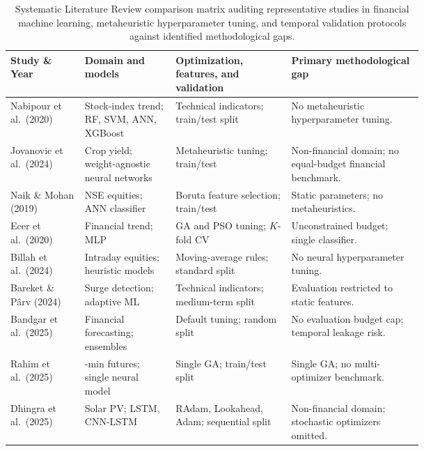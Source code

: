 \begin{table}[!htbp]
\caption{Systematic Literature Review comparison matrix auditing representative studies in financial machine learning, metaheuristic hyperparameter tuning, and temporal validation protocols against identified methodological gaps.}
\label{tab:literature_gap}
\centering
\manuscripttablestyle
\footnotesize
\begin{tabularx}{\linewidth}{@{}>{\raggedright\arraybackslash}p{0.18\linewidth} >{\raggedright\arraybackslash}p{0.22\linewidth} >{\raggedright\arraybackslash}p{0.29\linewidth} >{\raggedright\arraybackslash}X@{}}
\toprule
Study \& Year & Domain and models & Optimization, features, and validation & Primary methodological gap \\
\midrule
Nabipour et al.\ (2020) \cite{nabipour2020predicting} & Stock-index trend; RF, SVM, ANN, XGBoost & Technical indicators; train/test split & No metaheuristic hyperparameter tuning. \\
Jovanovic et al.\ (2024) \cite{jovanovic2024wann} & Crop yield; weight-agnostic neural networks & Metaheuristic tuning; train/test & Non-financial domain; no equal-budget financial benchmark. \\
Naik \& Mohan (2019) \cite{naik2019optimal} & NSE equities; ANN classifier & Boruta feature selection; train/test & Static parameters; no metaheuristics. \\
Ecer et al.\ (2020) \cite{ecer2020mlp_ga_pso} & Financial trend; MLP & GA and PSO tuning; $K$-fold CV & Unconstrained budget; single classifier. \\
Billah et al.\ (2024) \cite{billah2024nca_moving_average} & Intraday equities; heuristic models & Moving-average rules; standard split & No neural hyperparameter tuning. \\
Bareket \& P{\^a}rv (2024) \cite{bareket2024adaptive} & Surge detection; adaptive ML & Technical indicators; medium-term split & Evaluation restricted to static features. \\
Bandgar et al.\ (2025) \cite{bandgar2025finchronos} & Financial forecasting; ensembles & Default tuning; random split & No evaluation budget cap; temporal leakage risk. \\
Rahim et al.\ (2025) \cite{rahim2025technical} & 5-min futures; single neural model & Single GA; train/test split & Single GA; no multi-optimizer benchmark. \\
Dhingra et al.\ (2025) \cite{dhingra2025solar} & Solar PV; LSTM, CNN-LSTM & RAdam, Lookahead, Adam; sequential split & Non-financial domain; stochastic optimizers omitted. \\

\end{tabularx}
\end{table}
